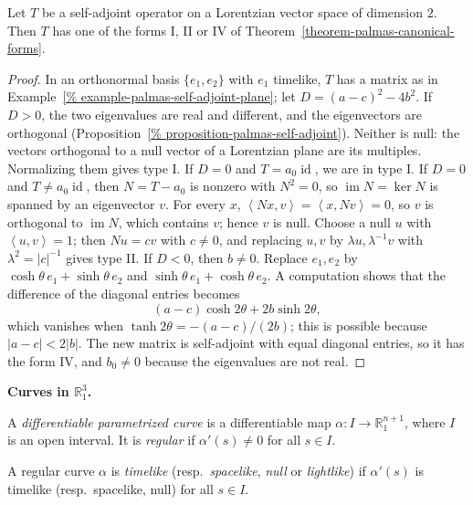 \begin{proposition}
\label{proposition-palmas-canonical-plane}
Let $T$ be a self-adjoint operator on a
Lorentzian vector space of dimension $2$.
Then $T$ has one of the forms I, II or IV
of
Theorem~\ref{theorem-palmas-canonical-forms}.
\end{proposition}

\begin{proof}
In an orthonormal basis $\{e_1,e_2\}$ with
$e_1$ timelike, $T$ has a matrix as in
Example~\ref{%
example-palmas-self-adjoint-plane};
let $D=(a-c)^2-4b^2$.
If $D>0$, the two eigenvalues are real and
different, and the eigenvectors are
orthogonal
(Proposition~\ref{%
proposition-palmas-self-adjoint}).
Neither is null: the vectors orthogonal to
a null vector of a Lorentzian plane are its
multiples. Normalizing them gives type I.
If $D=0$ and $T=a_0\operatorname{id}$, we
are in type I. If $D=0$ and $T\neq
a_0\operatorname{id}$, then $N=T-a_0$ is
nonzero with $N^2=0$, so
$\operatorname{im}N=\ker N$ is spanned by
an eigenvector $v$. For every $x$,
$\left\langle{} Nx,v \right\rangle{}
=\left\langle{} x,Nv \right\rangle{}=0$,
so $v$ is orthogonal to
$\operatorname{im}N$, which contains $v$;
hence $v$ is null. Choose a null $u$ with
$\left\langle{} u,v \right\rangle{}=1$;
then $Nu=cv$ with $c\neq 0$, and replacing
$u,v$ by $\lambda u,\lambda^{-1}v$ with
$\lambda^2=|c|^{-1}$ gives type II.
If $D<0$, then $b\neq 0$. Replace $e_1,e_2$
by $\cosh\theta\,e_1+\sinh\theta\,e_2$ and
$\sinh\theta\,e_1+\cosh\theta\,e_2$. A
computation shows that the difference of
the diagonal entries becomes
$$
(a-c)\cosh 2\theta+2b\sinh 2\theta,
$$
which vanishes when
$\tanh 2\theta=-(a-c)/(2b)$; this is
possible because $|a-c|<2|b|$. The new
matrix is self-adjoint with equal diagonal
entries, so it has the form IV, and
$b_0\neq 0$ because the eigenvalues are
not real.
\end{proof}

\medskip\noindent
{\bf Curves in $\mathbb{R}^3_1$.}

\begin{definition}
\label{definition-palmas-regular-curve}
A \emph{differentiable parametrized curve}
is a differentiable map
$\alpha\colon I\to\mathbb{R}^{n+1}_1$,
where $I$ is an open interval. It is
\emph{regular} if $\alpha'(s)\neq 0$ for
all $s\in I$.
\end{definition}

\begin{definition}
\label{definition-palmas-causal-curve}
A regular curve $\alpha$ is
\emph{timelike} (resp.\
\emph{spacelike}, \emph{null} or
\emph{lightlike}) if $\alpha'(s)$ is
timelike (resp.\ spacelike, null) for all
$s\in I$.
\end{definition}

